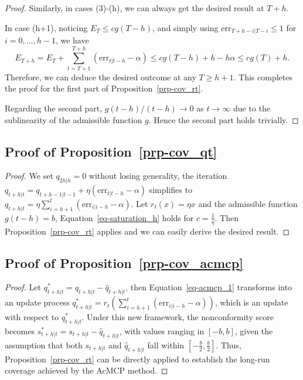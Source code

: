 \documentclass[
  11pt,
  a4paper,
]{article}
\theoremstyle{plain}
\theoremstyle{remark}
\begin{document}
\begin{proof}
Similarly, in cases (3)-(h), we can always get the desired result at
\(T+h\).

In case (h+1), noticing \(E_T \leq cg(T-h)\), and simply using
\(\mathrm{err}_{T+h-i|T-i} \leq 1\) for \(i=0,\ldots,h-1\), we have \[
E_{T+h} = E_T+\sum_{t=T+1}^{T+h}(\mathrm{err}_{t|t-h}-\alpha) \leq cg(T-h)+h-h\alpha \leq cg(T)+h.
\] Therefore, we can deduce the desired outcome at any \(T \geq h+1\).
This completes the proof for the first part of
Proposition~\ref{prp-cov_rt}.

Regarding the second part, \(g(t-h)/(t-h) \rightarrow 0\) as
\(t \rightarrow \infty\) due to the sublinearity of the admissible
function \(g\). Hence the second part holds trivially.
\end{proof}

\subsection{\texorpdfstring{Proof of
Proposition~\ref{prp-cov_qt}}{Proof of Proposition~}}\label{sec-proof_cov_qt}

\begin{proof}
We set \(q_{2h|h}=0\) without losing generality, the iteration
\(q_{t+h|t}=q_{t+h-1|t-1}+\eta \left(\mathrm{err}_{t|t-h}-\alpha\right)\)
simplifies to
\(q_{t+h|t}=\eta \sum_{i=h+1}^{t}\left(\mathrm{err}_{i|i-h}-\alpha\right)\).
Let \(r_t(x) = \eta x\) and the admissible function \(g(t-h) = b\),
Equation~\ref{eq-saturation_h} holds for \(c=\frac{1}{\eta}\). Then
Proposition~\ref{prp-cov_rt} applies and we can easily derive the
desired result.
\end{proof}

\subsection{\texorpdfstring{Proof of
Proposition~\ref{prp-cov_acmcp}}{Proof of Proposition~}}\label{sec-proof_cov_acmcp}

\begin{proof}
Let \(q_{t+h|t}^{*}=q_{t+h|t}-\hat{q}_{t+h|t}\), then
Equation~\ref{eq-acmcp_1} transforms into an update process
\(q_{t+h|t}^{*}=r_t\left(\sum_{i=h+1}^t \left(\mathrm{err}_{i|i-h}-\alpha\right)\right)\),
which is an update with respect to \(q_{t+h|t}^{*}\). Under this new
framework, the nonconformity score becomes
\(s_{t+h|t}^{*}=s_{t+h|t}-\hat{q}_{t+h|t}\), with values ranging in
\([-b,b]\), given the assumption that both \(s_{t+h|t}\) and
\(\hat{q}_{t+h|t}\) fall within \([-\frac{b}{2},\frac{b}{2}]\). Thus,
Proposition~\ref{prp-cov_rt} can be directly applied to establish the
long-run coverage achieved by the AcMCP method.
\end{proof}
\end{document}
